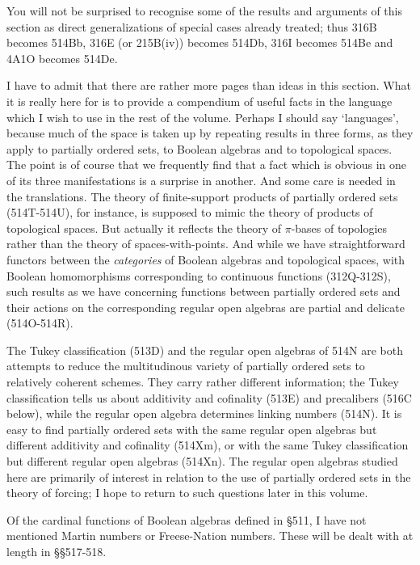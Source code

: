 {You will not be surprised to recognise some of the results and arguments
of this section as direct generalizations of special cases already
treated;  thus 316B becomes 514Bb, 316E (or 215B(iv)) becomes 514Db,
316I becomes 514Be and 4A1O becomes 514De.

I have to admit that there are rather more pages than ideas in this
section.   What it is really here for is to provide a compendium of
useful facts in the language which I wish to use in the rest of the
volume.   Perhaps I should say `languages', because much of the space is
taken up by repeating results in three forms, as they apply to partially
ordered sets, to Boolean algebras and to topological spaces.   The point
is of course that we frequently find that a fact which is obvious in one
of its three manifestations is a surprise in another.   And some care is
needed in the translations.   The theory of finite-support products of
partially ordered sets (514T-514U), for instance, is supposed to mimic
the theory of products of topological spaces.   But actually it reflects
the theory of $\pi$-bases of topologies rather than the theory of
spaces-with-points.   And while we have straightforward functors between
the {\it categories} of Boolean algebras and topological spaces, with
Boolean homomorphisms corresponding to continuous functions (312Q-312S),
such results as we have concerning functions between partially ordered
sets and their actions on the corresponding
regular open algebras are partial and
delicate (514O-514R).  %

The Tukey classification (513D) and the
regular open algebras of 514N are both attempts to reduce the
multitudinous variety of partially ordered sets to relatively coherent
schemes.   They carry rather different information;  the Tukey
classification tells us about additivity and cofinality (513E) and
precalibers (516C below), while the regular open algebra determines
linking numbers (514N).   It is easy to find partially ordered sets with
the same regular open algebras but different additivity and cofinality
(514Xm), or with the same Tukey classification but different regular
open algebras (514Xn).   The regular open algebras
studied here are primarily of interest in relation to the use of
partially ordered sets in the theory of
forcing;  I hope to return to such questions later in this volume.


Of the cardinal functions of Boolean algebras defined in \S511, I have
not mentioned Martin numbers or Freese-Nation numbers.   These will
be dealt with at length in \S\S517-518.
}%

\discrpage

